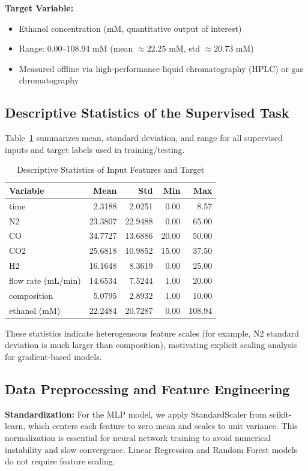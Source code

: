 \documentclass[conference]{IEEEtran}
\begin{document}
\textbf{Target Variable:}
\begin{itemize}
\item Ethanol concentration (mM, quantitative output of interest)
\item Range: 0.00--108.94 mM (mean $\approx 22.25$ mM, std $\approx 20.73$ mM)
\item Measured offline via high-performance liquid chromatography (HPLC) or gas chromatography
\end{itemize}

\subsection{Descriptive Statistics of the Supervised Task}
Table~\ref{tab:descstats} summarizes mean, standard deviation, and range for all supervised inputs and target labels used in training/testing.

\begin{table}[htbp]
\caption{Descriptive Statistics of Input Features and Target}
\label{tab:descstats}
\centering
\begin{tabular}{lrrrr}
\toprule
Variable & Mean & Std & Min & Max \\
\midrule
time & 2.3188 & 2.0251 & 0.00 & 8.57 \\
N2 & 23.3807 & 22.9488 & 0.00 & 65.00 \\
CO & 34.7727 & 13.6886 & 20.00 & 50.00 \\
CO2 & 25.6818 & 10.9852 & 15.00 & 37.50 \\
H2 & 16.1648 & 8.3619 & 0.00 & 25.00 \\
flow rate (mL/min) & 14.6534 & 7.5244 & 1.00 & 20.00 \\
composition & 5.0795 & 2.8932 & 1.00 & 10.00 \\
ethanol (mM) & 22.2484 & 20.7287 & 0.00 & 108.94 \\
\bottomrule
\end{tabular}
\end{table}

These statistics indicate heterogeneous feature scales (for example, N2 standard deviation is much larger than composition), motivating explicit scaling analysis for gradient-based models.

\subsection{Data Preprocessing and Feature Engineering}
\textbf{Standardization:} For the MLP model, we apply StandardScaler from scikit-learn, which centers each feature to zero mean and scales to unit variance. This normalization is essential for neural network training to avoid numerical instability and slow convergence. Linear Regression and Random Forest models do not require feature scaling.
\end{document}
